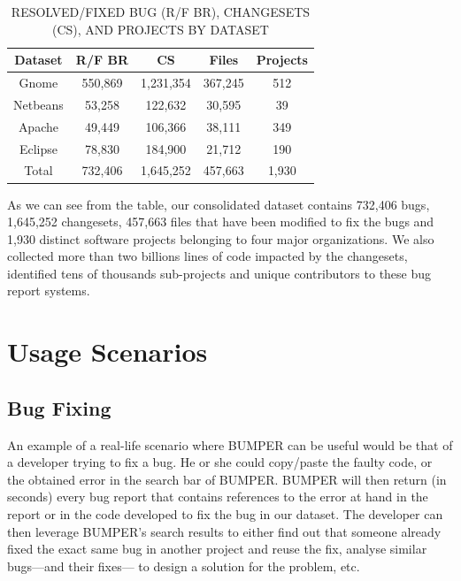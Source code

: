 \documentclass[conference]{IEEEtran}
\begin{document}
\begin{table}[]
\centering
\caption{
RESOLVED/FIXED BUG (R/F BR),  CHANGESETS (CS), AND
PROJECTS BY DATASET}
\label{tab:summary}
\begin{tabular}{c|c|c|c|c}
\textbf{Dataset} & \textbf{R/F BR} & \textbf{CS} & \textbf{Files} & \textbf{Projects} \\ \hline \hline
Gnome            & 550,869         & 1,231,354   & 367,245        & 512                \\ \hline
Netbeans         & 53,258          & 122,632     & 30,595         & 39                \\ \hline
Apache           & 49,449          & 106,366     & 38,111         & 349               \\ \hline
Eclipse          & 78,830          & 184,900     & 21,712         & 190                \\ \hline \hline
Total            & 732,406         & 1,645,252   & 457,663        & 1,930               \\ \hline \hline
\end{tabular}
\vspace{-2em}
\end{table}

As we can see from the table, our consolidated dataset contains 732,406 bugs,
1,645,252 changesets, 457,663 files that have been modified to fix the bugs
and 1,930 distinct software projects belonging to four major organizations.
We also collected more than two billions lines of code impacted by the
changesets, identified tens of thousands sub-projects and unique contributors
to these bug report systems.


\section{Usage Scenarios}

\subsection{Bug Fixing}
\label{subs:Bug Fixing}


An example of a real-life scenario where BUMPER can be useful would be
that of a developer trying to fix a bug. He or she could copy/paste the
faulty code, or the obtained error in the search bar of BUMPER.
BUMPER will then return (in  seconds) every bug report that contains
references to the error at hand in the report or in the code developed
to fix the bug in our dataset. The developer can then leverage BUMPER’s
search results to either find out that someone already fixed the exact same
bug in another project and reuse the fix, analyse similar bugs---and their fixes---
to design a solution for the problem, etc.
\end{document}
